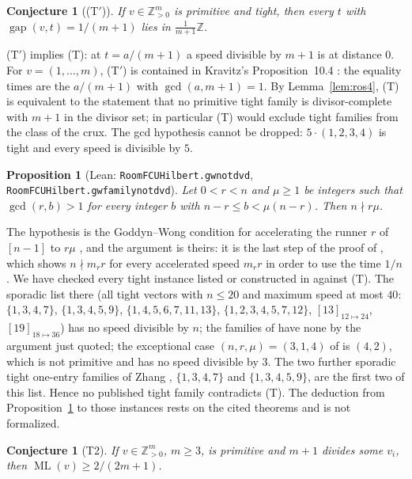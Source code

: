 \documentclass[11pt]{amsart}
\theoremstyle{plain}
\newtheorem{proposition}[theorem]{Proposition}
\newtheorem{conjecture}[theorem]{Conjecture}
\theoremstyle{definition}
\theoremstyle{remark}
\newcommand{\ML}{\operatorname{ML}}
\newcommand{\gap}{\operatorname{gap}}
\newcommand{\Z}{\mathbb{Z}}
\newcommand{\lean}[1]{{\def\_{\textunderscore\allowbreak}\def\.{.\allowbreak}\texttt{#1}}}
\begin{document}
\begin{conjecture}[(T$'$)]\label{conj:Tprime}
If $v\in\Z_{>0}^m$ is primitive and tight, then every $t$ with $\gap(v,t)=1/(m+1)$ lies in
$\frac1{m+1}\Z$.
\end{conjecture}

(T$'$) implies (T): at $t=a/(m+1)$ a speed divisible by $m+1$ is at distance $0$. For
$v=(1,\dots,m)$, (T$'$) is contained in Kravitz's Proposition~10.4 \cite{kravitz}: the equality
times are the $a/(m+1)$ with $\gcd(a,m+1)=1$. By Lemma~\ref{lem:ros4},
(T) is equivalent to the statement that no primitive tight family is divisor-complete with
$m+1$ in the divisor set; in particular (T) would exclude tight families from the class of the
crux. The gcd hypothesis cannot be dropped: $5\cdot(1,2,3,4)$ is tight and every speed is
divisible by $5$.

\begin{proposition}[Lean: \lean{RoomFCUHilbert\.gw\_not\_dvd}, \lean{RoomFCUHilbert\.gw\_family\_not\_dvd}]\label{prop:gw}
Let $0<r<n$ and $\mu\ge1$ be integers such that $\gcd(r,b)>1$ for every integer $b$ with
$n-r\le b<\mu(n-r)$. Then $n\nmid r\mu$.
\end{proposition}

The hypothesis is the Goddyn--Wong condition for accelerating the runner $r$ of $[n-1]$ to $r\mu$
\cite[Thm.~2.3]{gw}, and the argument is theirs: it is the last step of the proof of
\cite[Thm.~3.1]{gw}, which shows $n\nmid m_rr$ for every accelerated speed $m_rr$ in order to use
the time $1/n$. We have checked every tight instance listed or constructed in \cite{gw} against
(T). The sporadic list there (all tight vectors with $n\le 20$ and maximum speed at most $40$:
$\{1,3,4,7\}$, $\{1,3,4,5,9\}$, $\{1,4,5,6,7,11,13\}$, $\{1,2,3,4,5,7,12\}$, $[13]_{12\mapsto24}$,
$[19]_{18\mapsto36}$) has no speed divisible by $n$; the families of \cite[Thms.~2.3, 3.1]{gw}
have none by the argument just quoted; the exceptional case $(n,r,\mu)=(3,1,4)$ of
\cite[Thm.~2.3]{gw} is $(4,2)$, which is not primitive and has no speed divisible by $3$. The
two further sporadic tight one-entry families of Zhang \cite[Thm.~1.2]{zhang}, $\{1,3,4,7\}$ and
$\{1,3,4,5,9\}$, are the first two of this list. Hence no published tight family contradicts (T).
The deduction from Proposition~\ref{prop:gw} to those instances rests on the cited theorems and is
not formalized.

\begin{conjecture}[T2]\label{conj:T2}
If $v\in\Z_{>0}^m$, $m\ge 3$, is primitive and $m+1$ divides some $v_i$, then
$\ML(v)\ge 2/(2m+1)$.
\end{conjecture}
\end{document}
